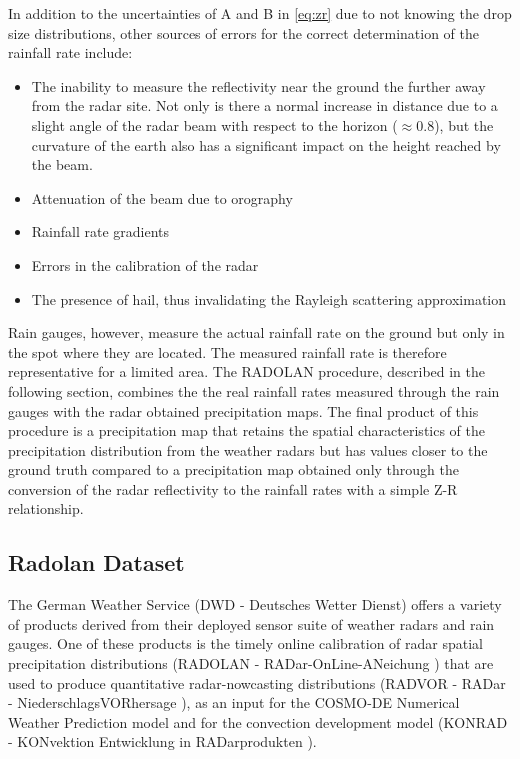 In addition to the uncertainties of A and B in \cref{eq:zr} due to not knowing the drop size distributions, other sources of errors for the correct determination of the rainfall rate include:
\begin{itemize}
    \item The inability to measure the reflectivity near the ground the further away from the radar site. Not only is there a normal increase in distance due to a slight angle of the radar beam with respect to the horizon ($\approx$0.8\textdegree), but the curvature of the earth also has a significant impact on the height reached by the beam.
    \item Attenuation of the beam due to orography
    \item Rainfall rate gradients
    \item Errors in the calibration of the radar
    \item The presence of hail, thus invalidating the Rayleigh scattering approximation
\end{itemize}

Rain gauges, however, measure the actual rainfall rate on the ground but only in the spot where they are located. The measured rainfall rate is therefore representative for a limited area. The RADOLAN procedure, described in the following section, combines the the real rainfall rates measured through the rain gauges with the radar obtained precipitation maps. The final product of this procedure is a precipitation map that retains the spatial characteristics of the precipitation distribution from the weather radars but has values closer to the ground truth compared to a precipitation map obtained only through the conversion of the radar reflectivity to the rainfall rates with a simple Z-R relationship.

\subsection{Radolan Dataset} \label{sec:radolan}
The German Weather Service (DWD - Deutsches Wetter Dienst) offers a variety of products derived from their deployed sensor suite of weather radars and rain gauges. One of these products is the timely online calibration of radar spatial precipitation distributions (RADOLAN - RADar-OnLine-ANeichung \citet{DeutscherWetterdienst2022RADOLANANeichung}) that are used to produce quantitative radar-nowcasting distributions (RADVOR - RADar - NiederschlagsVORhersage \citet{DeutscherWetterdienst2022RADVORRadar-Niederschlagsvorhersage}), as an input for the COSMO-DE Numerical Weather Prediction model and for the convection development model (KONRAD - KONvektion Entwicklung in RADarprodukten \citet{DeutscherWetterdienst2022KONRADRADarprodukten}).

